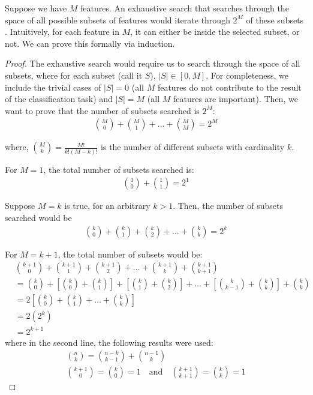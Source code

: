 \documentclass[12pt, twoside, a4paper]{report}
\begin{document}
Suppose we have $M$ features. An exhaustive search that searches through the space of all possible subsets of features would iterate through $2^M$ of these subsets \cite{RefWorks:182}. Intuitively, for each feature in $M$, it can either be inside the selected subset, or not. We can prove this formally via induction.

\begin{proof}
The exhaustive search would require us to search through the space of all subsets, where for each subset (call it $S$), $|S| \in \left[ 0, M \right]$. For completeness, we include the trivial cases of $|S|=0$ (all $M$ features do not contribute to the result of the classification task) and $|S|=M$ (all $M$ features are important). Then, we want to prove that the number of subsets searched is $2^M$:
\begin{align*}
{{M}\choose{0}} + {{M}\choose{1}} + \dots + {{M}\choose{M}} = 2^M
\end{align*}

where, ${{M}\choose{k}} = \frac{M!}{k!(M-k)!}$ is the number of different subsets with cardinality $k$. 

For $M=1$, the total number of subsets searched is:
\begin{align*}
{{1}\choose{0}} + {{1}\choose{1}} = 2^1
\end{align*}

Suppose $M=k$ is true, for an arbitrary $k>1$. Then, the number of subsets searched would be
\begin{align*}
{{k}\choose{0}} + {{k}\choose{1}} + {{k}\choose{2}} + \dots + {{k}\choose{k}} = 2^k 
\end{align*}

For $M=k+1$, the total number of subsets would be:
\begin{align*}
&{{k+1}\choose{0}} + {{k+1}\choose{1}} + {{k+1}\choose{2}} + \dots + {{k+1}\choose{k}} + {{k+1}\choose{k+1}} \\
&= {{k}\choose{0}} + \left[ {{k}\choose{0}} + {{k}\choose{1}} \right] + \left[ {{k}\choose{1}} + {{k}\choose{2}} \right] + \dots + \left[ {{k}\choose{k-1}} + {{k}\choose{k}} \right] + {{k}\choose{k}} \\
&= 2 \left[ {{k}\choose{0}} + {{k}\choose{1}} + \dots + {{k}\choose{k}} \right] \\
&= 2 \left(2^k \right) \\
&= 2^{k+1}
\end{align*}
where in the second line, the following results were used:
\begin{gather*}
{{n}\choose{k}} = {{n-k}\choose{k-1}} + {{n-1}\choose{k}} \\
{{k+1}\choose{0}} = {{k}\choose{0}} = 1 \quad \text{and} \quad {{k+1}\choose{k+1}} = {{k}\choose{k}} = 1
\end{gather*}
\end{proof}
\end{document}
